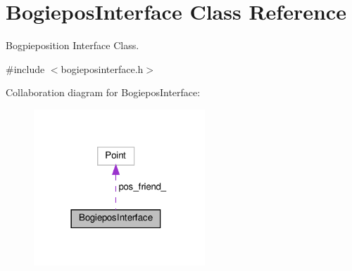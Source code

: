 \hypertarget{classBogieposInterface}{}\section{Bogiepos\+Interface Class Reference}
\label{classBogieposInterface}


Bogpieposition Interface Class.  




{\ttfamily \#include $<$bogieposinterface.\+h$>$}



Collaboration diagram for Bogiepos\+Interface\+:\nopagebreak
\begin{figure}[H]
\begin{center}
\leavevmode
\includegraphics[width=182pt]{classBogieposInterface__coll__graph}
\end{center}
\end{figure}
